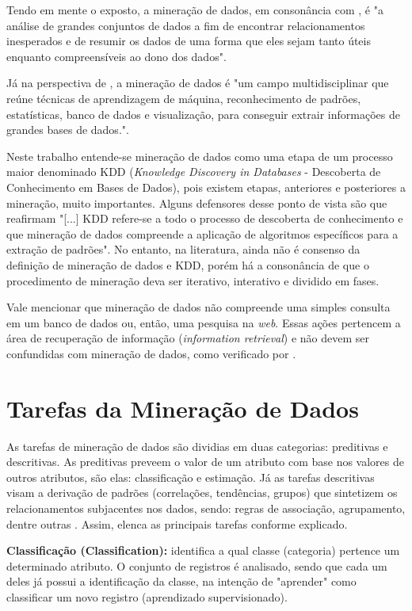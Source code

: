 \documentclass[tg]{mdtufsm}
\begin{document}
Tendo em mente o exposto, a mineração de dados, em consonância com \cite{hand}, é "a análise de grandes conjuntos de dados a fim de encontrar relacionamentos inesperados e de resumir os dados de uma forma que eles sejam tanto úteis enquanto compreensíveis ao dono dos dados".

Já na perspectiva de \cite{cabena}, a mineração de dados é "um campo multidisciplinar que reúne técnicas de aprendizagem de máquina, reconhecimento de padrões, estatísticas, banco de dados e visualização, para conseguir extrair informações de grandes bases de dados.". 

Neste trabalho entende-se mineração de dados como uma etapa de um processo maior denominado KDD ({\it Knowledge Discovery in Databases} - Descoberta de Conhecimento em Bases de Dados), pois existem etapas, anteriores e posteriores a mineração, muito importantes. Alguns defensores desse ponto de vista são \cite{fayyad} que reafirmam "[...] KDD refere-se a todo o processo de descoberta de conhecimento e que mineração de dados compreende a aplicação de algoritmos específicos para a extração de padrões". No entanto, na literatura, ainda não é consenso da definição de mineração de dados e KDD, porém há a consonância de que o procedimento de mineração deva ser iterativo, interativo e dividido em fases.  

Vale mencionar que mineração de dados não compreende uma simples consulta em um banco de dados ou, então, uma pesquisa na \textit{web}. Essas ações pertencem a área de recuperação de informação (\textit{information retrieval}) e não devem ser confundidas com mineração de dados, como verificado por \cite{pang-ning}.

\section{Tarefas da Mineração de Dados}

As tarefas de mineração de dados são dividias em duas categorias: preditivas e descritivas. As preditivas preveem o valor de um atributo com base nos valores de outros atributos, são elas: classificação e estimação. Já as tarefas descritivas visam a derivação de padrões (correlações, tendências, grupos) que sintetizem os relacionamentos subjacentes nos dados, sendo: regras de associação, agrupamento, dentre outras \cite{pang-ning}. Assim, \cite{larose2005} elenca as principais tarefas conforme explicado.

\textbf{Classificação (Classification):} identifica a qual classe (categoria) pertence um determinado atributo. O conjunto de registros é analisado, sendo que cada um deles já possui a identificação da classe, na intenção de "aprender" como classificar um novo registro (aprendizado supervisionado).
\end{document}
